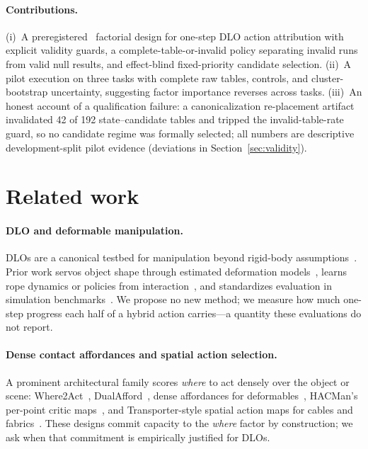 \documentclass{article}
\begin{document}
\paragraph{Contributions.}
(i)~A preregistered~\citep{nosek2018preregistration} factorial design for
one-step DLO action attribution with explicit validity guards, a
complete-table-or-invalid policy separating invalid runs from valid null
results, and effect-blind fixed-priority candidate selection.
(ii)~A pilot execution on three tasks with complete raw tables, controls,
and cluster-bootstrap uncertainty, suggesting factor importance reverses
across tasks.
(iii)~An honest account of a qualification failure: a canonicalization
re-placement artifact invalidated 42 of 192 state--candidate tables and
tripped the invalid-table-rate guard, so no candidate regime was formally
selected; all numbers are descriptive development-split pilot evidence
(deviations in Section~\ref{sec:validity}).

\section{Related work}
\paragraph{DLO and deformable manipulation.}
DLOs are a canonical testbed for manipulation beyond rigid-body
assumptions~\citep{sanchez2018robotic,zhu2022challenges}. Prior work servos
object shape through estimated deformation
models~\citep{berenson2013manipulation,navarro2016automatic,yang2023modal},
learns rope dynamics or policies from
interaction~\citep{nair2017combining,wu2020learning,chi2022irp}, and
standardizes evaluation in simulation
benchmarks~\citep{lin2021softgym,cao2026dlolab}. We propose no new method;
we measure how much one-step progress each half of a hybrid action
carries---a quantity these evaluations do not report.

\paragraph{Dense contact affordances and spatial action selection.}
A prominent architectural family scores \emph{where} to act densely over
the object or scene: Where2Act~\citep{mo2021where2act},
DualAfford~\citep{zhao2023dualafford}, dense affordances for
deformables~\citep{wu2023foresightful}, HACMan's per-point critic
maps~\citep{zhou2023hacman}, and Transporter-style spatial action maps
for cables and fabrics~\citep{zeng2021transporter,seita2021learning}. These designs commit
capacity to the \emph{where} factor by construction; we ask when that
commitment is empirically justified for DLOs.
\end{document}
